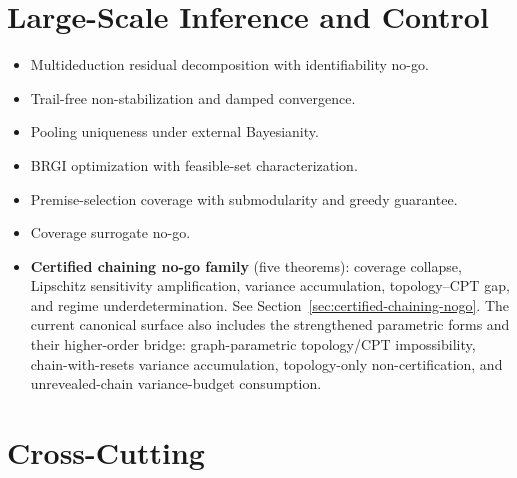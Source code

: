 \documentclass[11pt,openany]{report}
\begin{document}
\section{Large-Scale Inference and Control}

\begin{itemize}
\item Multideduction residual decomposition with identifiability no-go.
\item Trail-free non-stabilization and damped convergence.
\item Pooling uniqueness under external Bayesianity.
\item BRGI optimization with feasible-set characterization.
\item Premise-selection coverage with submodularity and greedy guarantee.
\item Coverage surrogate no-go.
\item \textbf{Certified chaining no-go family} (five theorems):
  coverage collapse, Lipschitz sensitivity amplification, variance
  accumulation, topology--CPT gap, and regime underdetermination.
  See Section~\ref{sec:certified-chaining-nogo}.  The current canonical
  surface also includes the strengthened parametric forms and their
  higher-order bridge: graph-parametric topology/CPT impossibility,
  chain-with-resets variance accumulation, topology-only non-certification,
  and unrevealed-chain variance-budget consumption.
\end{itemize}

\section{Cross-Cutting}
\end{document}
